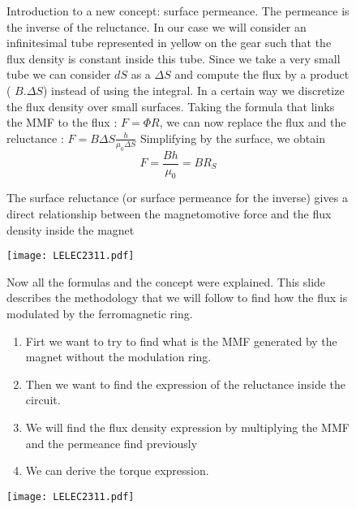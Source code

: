 \begin{figure}[H]
    \begin{minipage}{.45\linewidth}
    
        Introduction to a new concept: surface permeance. The permeance is the inverse of the reluctance. 
        In our case we will consider an infinitesimal tube represented in yellow on the gear such that the flux density is constant inside this tube. Since we take a very small tube we can consider $dS$ as a $\Delta S$ and compute the flux by a product ( $ B.\Delta S$) instead of using the integral. In a certain way we discretize the flux density over small surfaces.
        Taking the formula that links the MMF to the flux : $F = \Phi R$, we can now replace the flux and the reluctance : $F = B \Delta S \frac{h}{\mu_0\Delta S}$ Simplifying by the surface, we obtain $$ F = \frac{ B h}{\mu_0 }  = B R_S $$
        
       The surface reluctance (or surface permeance for the inverse) gives a direct relationship between the magnetomotive force and the flux density inside the magnet 
       
    \end{minipage}
    \hfill%
    \begin{minipage}[c]{.45\linewidth}
        \centering
        \texttt{[image: LELEC2311.pdf]}
    \end{minipage}
\end{figure}

\begin{figure}[H]
    \begin{minipage}{.45\linewidth}
        Now all the formulas and the concept were explained. This slide describes the methodology that we will follow to find how the flux is modulated by the ferromagnetic ring. 
        
        \begin{enumerate}
            \item Firt we want to try to find what is the MMF generated by the magnet without the modulation ring.
            \item Then we want to find the expression of the reluctance inside the circuit.
            \item We will find the flux density expression by multiplying the MMF and the permeance find previously
            \item We can derive the torque expression.
        \end{enumerate}
        
    \end{minipage}
    \hfill%
    \begin{minipage}[c]{.45\linewidth}
        \centering
        \texttt{[image: LELEC2311.pdf]}
    \end{minipage}
\end{figure}

